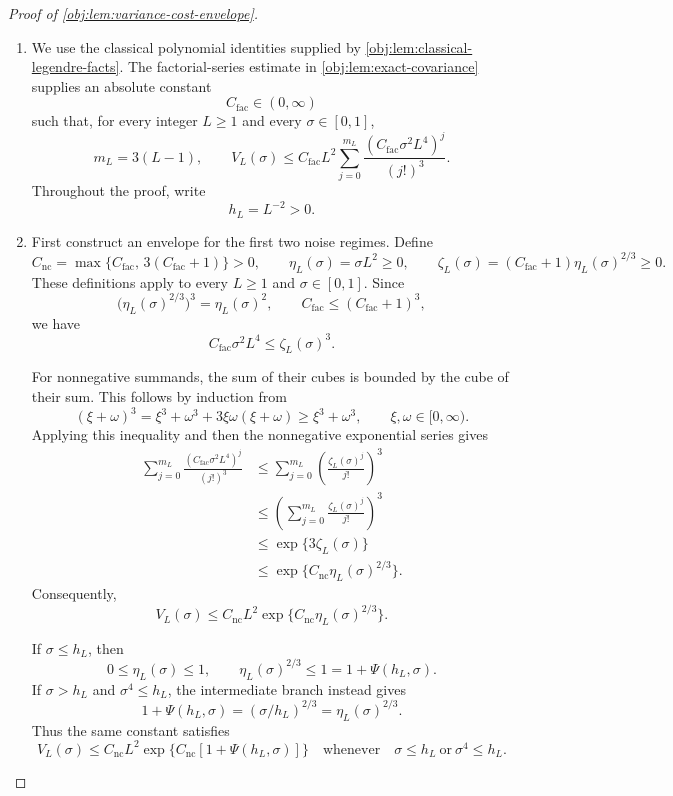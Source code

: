 \documentclass[11pt]{article}
\begin{document}
\begin{proof}[Proof of \cref{obj:lem:variance-cost-envelope}]
\begin{enumerate}
\item We use the classical polynomial identities supplied by
\cref{obj:lem:classical-legendre-facts}. The factorial-series estimate in
\cref{obj:lem:exact-covariance} supplies an absolute constant
\[
C_{\mathrm{fac}}\in(0,\infty)
\]
such that, for every integer \(L\ge1\) and every \(\sigma\in[0,1]\),
\[
m_L=3(L-1),\qquad
V_L(\sigma)\le C_{\mathrm{fac}}L^2
\sum_{j=0}^{m_L}
\frac{(C_{\mathrm{fac}}\sigma^2L^4)^j}{(j!)^3}.
\]
Throughout the proof, write
\[
h_L=L^{-2}>0.
\]

\item First construct an envelope for the first two noise regimes. Define
\[
C_{\mathrm{nc}}
=\max\{C_{\mathrm{fac}},\,3(C_{\mathrm{fac}}+1)\}>0,
\qquad
\eta_L(\sigma)=\sigma L^2\ge0,
\qquad
\zeta_L(\sigma)=(C_{\mathrm{fac}}+1)\eta_L(\sigma)^{2/3}\ge0.
\]
These definitions apply to every \(L\ge1\) and \(\sigma\in[0,1]\). Since
\[
\bigl(\eta_L(\sigma)^{2/3}\bigr)^3=\eta_L(\sigma)^2,
\qquad
C_{\mathrm{fac}}\le(C_{\mathrm{fac}}+1)^3,
\]
we have
\[
C_{\mathrm{fac}}\sigma^2L^4
\le \zeta_L(\sigma)^3.
\]

For nonnegative summands, the sum of their cubes is bounded by the cube
of their sum. This follows by induction from
\[
(\xi+\omega)^3
=\xi^3+\omega^3+3\xi\omega(\xi+\omega)
\ge \xi^3+\omega^3,
\qquad \xi,\omega\in[0,\infty).
\]
Applying this inequality and then the nonnegative exponential series gives
\[
\begin{aligned}
\sum_{j=0}^{m_L}
\frac{(C_{\mathrm{fac}}\sigma^2L^4)^j}{(j!)^3}
&\le
\sum_{j=0}^{m_L}
\left(\frac{\zeta_L(\sigma)^j}{j!}\right)^3\\
&\le
\left(\sum_{j=0}^{m_L}\frac{\zeta_L(\sigma)^j}{j!}\right)^3\\
&\le \exp\{3\zeta_L(\sigma)\}\\
&\le \exp\{C_{\mathrm{nc}}\eta_L(\sigma)^{2/3}\}.
\end{aligned}
\]
Consequently,
\[
V_L(\sigma)
\le C_{\mathrm{nc}}L^2
\exp\{C_{\mathrm{nc}}\eta_L(\sigma)^{2/3}\}.
\]

If \(\sigma\le h_L\), then
\[
0\le\eta_L(\sigma)\le1,
\qquad
\eta_L(\sigma)^{2/3}\le1
=1+\Psi(h_L,\sigma).
\]
If \(\sigma>h_L\) and \(\sigma^4\le h_L\), the intermediate branch instead gives
\[
1+\Psi(h_L,\sigma)
=(\sigma/h_L)^{2/3}
=\eta_L(\sigma)^{2/3}.
\]
Thus the same constant satisfies
\[
V_L(\sigma)\le C_{\mathrm{nc}}L^2
\exp\{C_{\mathrm{nc}}[1+\Psi(h_L,\sigma)]\}
\quad\text{whenever}\quad
\sigma\le h_L\ \text{or}\ \sigma^4\le h_L.
\]


\end{enumerate}
\end{proof}
\end{document}
